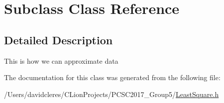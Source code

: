 \hypertarget{class_subclass}{}\section{Subclass Class Reference}
\label{class_subclass}


\subsection{Detailed Description}
This is how we can approximate data 

The documentation for this class was generated from the following file\+:\begin{DoxyCompactItemize}
\item 
/\+Users/davidcleres/\+C\+Lion\+Projects/\+P\+C\+S\+C2017\+\_\+\+Group5/\mbox{\hyperlink{_least_square_8h}{Least\+Square.\+h}}\end{DoxyCompactItemize}
